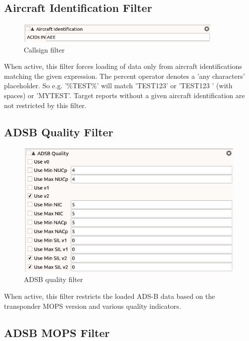 \subsection{Aircraft Identification Filter}

\begin{figure}[H]
  \center
    \includegraphics[width=10cm,frame]{figures/filter_acid.png}
  \caption{Callsign filter}
\end{figure}

When active, this filter forces loading of data only from aircraft identifications matching the given expression. The percent operator denotes a 'any characters' placeholder. So e.g. '\%TEST\%' will match 'TEST123' or 'TEST123   ' (with spaces) or 'MYTEST'. Target reports without a given aircraft identification are not restricted by this filter.

\subsection{ADSB Quality Filter}

\begin{figure}[H]
  \center
    \includegraphics[width=12cm,frame]{figures/filter_adsb_quality.png}
  \caption{ADSB quality filter}
\end{figure}

When active, this filter restricts the loaded ADS-B data based on the transponder MOPS version and various quality indicators. 

\subsection{ADSB MOPS Filter}

